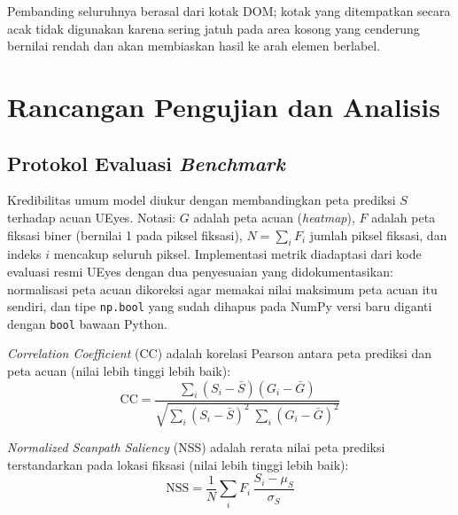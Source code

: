 Pembanding seluruhnya berasal dari kotak DOM; kotak yang ditempatkan secara acak tidak digunakan karena sering jatuh pada area kosong yang cenderung bernilai rendah dan akan membiaskan hasil ke arah elemen berlabel.

\section{Rancangan Pengujian dan Analisis}
\label{sec:pengujian}

\subsection{Protokol Evaluasi \emph{Benchmark}}
\label{subsec:benchmark}

Kredibilitas umum model diukur dengan membandingkan peta prediksi $S$ terhadap acuan UEyes. Notasi: $G$ adalah peta acuan (\emph{heatmap}), $F$ adalah peta fiksasi biner (bernilai 1 pada piksel fiksasi), $N=\sum_i F_i$ jumlah piksel fiksasi, dan indeks $i$ mencakup seluruh piksel. Implementasi metrik diadaptasi dari kode evaluasi resmi UEyes \citep{jiang2023ueyes} dengan dua penyesuaian yang didokumentasikan: normalisasi peta acuan dikoreksi agar memakai nilai maksimum peta acuan itu sendiri, dan tipe \texttt{np.bool} yang sudah dihapus pada NumPy versi baru diganti dengan \texttt{bool} bawaan Python.

\emph{Correlation Coefficient} (CC) adalah korelasi Pearson antara peta prediksi dan peta acuan (nilai lebih tinggi lebih baik):
\begin{equation}
  \mathrm{CC} = \frac{\sum_i (S_i-\bar{S})(G_i-\bar{G})}{\sqrt{\sum_i (S_i-\bar{S})^2\;\sum_i (G_i-\bar{G})^2}}
  \label{eq:cc}
\end{equation}

\emph{Normalized Scanpath Saliency} (NSS) adalah rerata nilai peta prediksi terstandarkan pada lokasi fiksasi (nilai lebih tinggi lebih baik):
\begin{equation}
  \mathrm{NSS} = \frac{1}{N}\sum_i F_i\,\frac{S_i-\mu_S}{\sigma_S}
  \label{eq:nss}
\end{equation}

